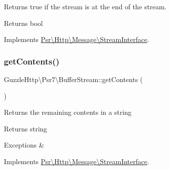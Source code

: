 Returns true if the stream is at the end of the stream.

\begin{DoxyReturn}{Returns}
bool 
\end{DoxyReturn}


Implements \hyperlink{interfacePsr_1_1Http_1_1Message_1_1StreamInterface_a502cc5ca370c6925b78d95d86d68777c}{Psr\textbackslash{}\+Http\textbackslash{}\+Message\textbackslash{}\+Stream\+Interface}.

\mbox{\label{classGuzzleHttp_1_1Psr7_1_1BufferStream_aab2ed71f0cfa742e24025ad761a0cd25}} 
\subsubsection{\texorpdfstring{get\+Contents()}{getContents()}}
{\footnotesize\ttfamily Guzzle\+Http\textbackslash{}\+Psr7\textbackslash{}\+Buffer\+Stream\+::get\+Contents (\begin{DoxyParamCaption}{ }\end{DoxyParamCaption})}

Returns the remaining contents in a string

\begin{DoxyReturn}{Returns}
string 
\end{DoxyReturn}

\begin{DoxyExceptions}{Exceptions}
{\em } & \\
\hline
\end{DoxyExceptions}


Implements \hyperlink{interfacePsr_1_1Http_1_1Message_1_1StreamInterface_a77f73d536f77e4a4e281d548ee905276}{Psr\textbackslash{}\+Http\textbackslash{}\+Message\textbackslash{}\+Stream\+Interface}.

\mbox{\label{classGuzzleHttp_1_1Psr7_1_1BufferStream_aa7a661e5c0549b50afc537a3d33db728}} 
